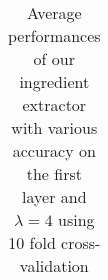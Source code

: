 \documentclass{article}
\begin{document}
\begin{table}
\begin{center}
\begin{tabular}{| l | l | l | l | l | l | l | l | l |}
    \end{tabular}
    \label{tab:tab10}
\end{center}
\caption{Average performances of our ingredient extractor with various accuracy on the first layer and $\lambda = 4$ using 10 fold cross-validation}
\end{table}
\end{document}
